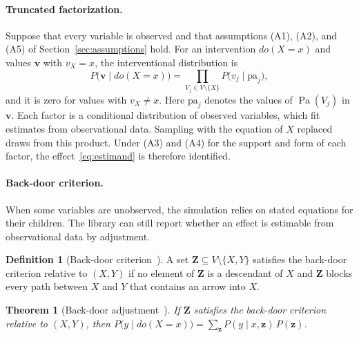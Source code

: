 \documentclass[12pt]{article}
\DeclareMathOperator{\Pa}{Pa}
\newcommand{\code}[1]{{\ttfamily\def\_{\textunderscore\allowbreak}#1}}
\theoremstyle{plain}
\newtheorem{theorem}{Theorem}
\theoremstyle{definition}
\newtheorem{definition}{Definition}
\begin{document}
\paragraph{Truncated factorization.}
Suppose that every variable is observed and that assumptions (A1), (A2), and (A5) of Section~\ref{sec:assumptions} hold. For an intervention $do(X=x)$ and values $\mathbf{v}$ with $v_X=x$, the interventional distribution is~\cite{pearl2009causality}
\begin{equation}\label{eq:truncated}
    P\bigl(\mathbf{v}\mid do(X=x)\bigr)=\prod_{V_j\in V\setminus\{X\}}P\bigl(v_j\mid \mathrm{pa}_j\bigr),
\end{equation}
and it is zero for values with $v_X\neq x$. Here $\mathrm{pa}_j$ denotes the values of $\Pa(V_j)$ in $\mathbf{v}$. Each factor is a conditional distribution of observed variables, which \code{fit} estimates from observational data. Sampling with the equation of $X$ replaced draws from this product. Under (A3) and (A4) for the support and form of each factor, the effect~\eqref{eq:estimand} is therefore identified.

\paragraph{Back-door criterion.}
When some variables are unobserved, the simulation relies on stated equations for their children. The library can still report whether an effect is estimable from observational data by adjustment.

\begin{definition}[Back-door criterion~\cite{pearl1995causal}]\label{def:backdoor}
A set $\mathbf{Z}\subseteq V\setminus\{X,Y\}$ satisfies the back-door criterion relative to $(X,Y)$ if no element of $\mathbf{Z}$ is a descendant of $X$ and $\mathbf{Z}$ blocks every path between $X$ and $Y$ that contains an arrow into $X$.
\end{definition}

\begin{theorem}[Back-door adjustment~\cite{pearl1995causal,pearl2009causality}]\label{thm:backdoor}
If $\mathbf{Z}$ satisfies the back-door criterion relative to $(X,Y)$, then
$P\bigl(y\mid do(X=x)\bigr)=\sum_{\mathbf{z}}P(y\mid x,\mathbf{z})\,P(\mathbf{z})$.
\end{theorem}
\end{document}
